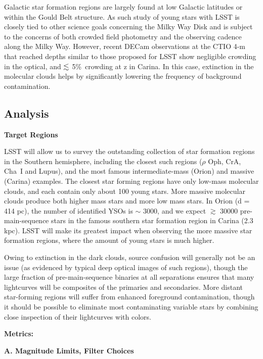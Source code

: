 Galactic star formation regions are largely found at low Galactic
latitudes or within the Gould Belt structure. As such study of young
stars with LSST is closely tied to other science goals concerning the
Milky Way Disk and is subject to the concerns of both crowded field
photometry and the observing cadence along the Milky Way. However, recent
DECam observations at the CTIO 4-m that reached depths similar to those
proposed for LSST show negligible crowding in the optical, and $\lesssim$
5\%\ crowding at z in Carina. In this case, extinction in the molecular
clouds helps by significantly lowering the frequency of background contamination. 


\subsection{Analysis}
\label{sec:\secname:analysis}

{\bf Target Regions}

LSST will allow us to survey the outstanding collection of 
star formation regions in the Southern hemisphere, including the closest
such regions ($\rho$ Oph, CrA, Cha~I and Lupus), and the most famous intermediate-mass
(Orion) and massive (Carina) examples. 
The closest star forming regions have only low-mass molecular clouds, and each contain
only about 100 young stars. More massive molecular clouds produce both higher
mass stars and more low mass stars. In Orion (d = 414 pc), the number of
identified YSOs is $\sim$ 3000, and we expect $\gtrsim$ 30000 pre-main-sequence
stars in the famous southern star formation region in Carina (2.3 kpc).
LSST will make its greatest impact
when observing the more massive star formation regions, where the amount
of young stars is much higher.

Owing to extinction in the dark clouds,
source confusion will generally not be an issue (as evidenced by typical
deep optical images of such regions), though the large fraction
of pre-main-sequence binaries at all separations ensures that many
lightcurves will be composites of the primaries and secondaries.
More distant star-forming regions will suffer from enhanced foreground
contamination, though it should be possible to eliminate most contaminating
variable stars by combining close inspection of their lightcurves with
colors.

{\bf Metrics:}

{\bf A. Magnitude Limits, Filter Choices}

